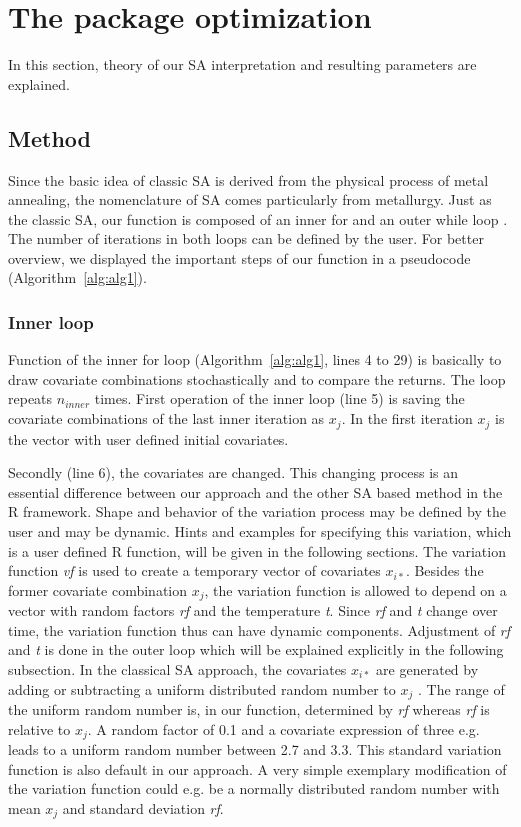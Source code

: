 \section{The package optimization}
In this section, theory of our SA interpretation and resulting parameters are explained.

\subsection{Method}
\label{subsec:method}
Since the basic idea of classic SA is derived from the physical process of metal annealing, the nomenclature of SA comes particularly from metallurgy. Just as the classic SA, our function is composed of an inner for and an outer while loop \citep{kirkpatrick_1983}. The number of iterations in both loops can be defined by the user. For better overview, we displayed the important steps of our function in a pseudocode (Algorithm~\ref{alg:alg1}).

\subsubsection{Inner loop}
Function of the inner for loop (Algorithm~\ref{alg:alg1}, lines 4 to 29) is basically to draw covariate combinations stochastically and to compare the returns. The loop repeats $n_{inner}$ times. First operation of the inner loop (line 5) is saving the covariate combinations of the last inner iteration as $x_j$. In the first iteration $x_j$ is the vector with user defined initial covariates.

Secondly (line 6), the covariates are changed. This changing process is an essential difference between our approach and the other SA based method in the R framework. Shape and behavior of the variation process may be defined by the user and may be dynamic. Hints and examples for specifying this variation, which is a user defined R function, will be given in the following sections. The variation function \textit{vf} is used to create a temporary vector of covariates $x_{i*}$. Besides the former covariate combination $x_j$, the variation function is allowed to depend on a vector with random factors \textit{rf} and the temperature \textit{t}. Since \textit{rf} and \textit{t} change over time, the variation function thus can have dynamic components. Adjustment of \textit{rf} and \textit{t} is done in the outer loop which will be explained explicitly in the following subsection. In the classical SA approach, the covariates $x_{i*}$ are generated by adding or subtracting a uniform distributed random number to $x_j$ \citep{kirkpatrick_1983}. The range of the uniform random number is, in our function, determined by \textit{rf} whereas \textit{rf} is relative to $x_j$. A random factor of 0.1 and a covariate expression of three e.g. leads to a uniform random number between 2.7 and 3.3. This standard variation function is also default in our approach. A very simple exemplary modification of the variation function could e.g. be a normally distributed random number with mean $x_j$ and standard deviation \textit{rf}.

